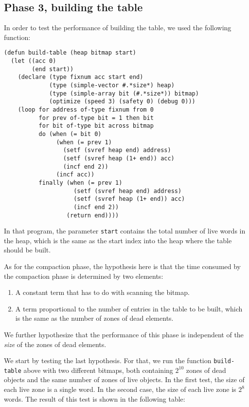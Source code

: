 \subsection{Phase 3, building the table}

In order to test the performance of building the table, we used the
following function:

{\small\begin{verbatim}
(defun build-table (heap bitmap start)
  (let ((acc 0)
        (end start))
    (declare (type fixnum acc start end)
             (type (simple-vector #.*size*) heap)
             (type (simple-array bit (#.*size*)) bitmap)
             (optimize (speed 3) (safety 0) (debug 0)))
    (loop for address of-type fixnum from 0 
          for prev of-type bit = 1 then bit
          for bit of-type bit across bitmap
          do (when (= bit 0)
               (when (= prev 1)
                 (setf (svref heap end) address)
                 (setf (svref heap (1+ end)) acc)
                 (incf end 2))
               (incf acc))
          finally (when (= prev 1)
                    (setf (svref heap end) address)
                    (setf (svref heap (1+ end)) acc)
                    (incf end 2))
                  (return end))))
\end{verbatim}}

In that program, the parameter \texttt{start} contains the total
number of live words in the heap, which is the same as the start index
into the heap where the table should be built. 

As for the compaction phase, the hypothesis here is that the time
consumed by the compaction phase is determined by two elements:

\begin{enumerate}
\item A constant term that has to do with scanning the bitmap.
\item A term proportional to the number of entries in the table to be
  built, which is the same as the number of zones of dead elements.
\end{enumerate}

We further hypothesize that the performance of this phase is
independent of the \emph{size} of the zones of dead elements. 

We start by testing the last hypothesis.  For that, we run the
function \texttt{build-table} above with two different bitmaps, both
containing $2^{10}$ zones of dead objects and the same number of zones
of live objects.  In the first test, the size of each live zone is a
single word.  In the second case, the size of each live zone is $2^8$
words.  The result of this test is shown in the following table:

